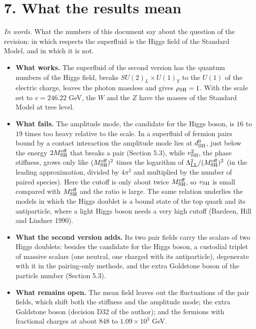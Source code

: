 \documentclass[
  10pt,
]{article}
\providecommand{\tightlist}{%
  \setlength{\itemsep}{0pt}\setlength{\parskip}{0pt}}
\begin{document}
\hypertarget{what-the-results-mean}{%
\section{7. What the results mean}\label{what-the-results-mean}}

\emph{In words.} What the numbers of this document say about the
question of the revision: in which respects the superfluid is the Higgs
field of the Standard Model, and in which it is not.

\begin{itemize}
\tightlist
\item
  \textbf{What works.} The superfluid of the second version has the
  quantum numbers of the Higgs field, breaks \(SU(2)_L\times U(1)_Y\) to
  the \(U(1)\) of the electric charge, leaves the photon massless and
  gives \(\rho_{\rm SH}=1\). With the scale set to \(v=246.22\) GeV, the
  \(W\) and the \(Z\) have the masses of the Standard Model at tree
  level.
\item
  \textbf{What fails.} The amplitude mode, the candidate for the Higgs
  boson, is \(16\) to \(19\) times too heavy relative to the scale. In a
  superfluid of fermion pairs bound by a contact interaction the
  amplitude mode lies at \(d^0_{\rm SH}\), just below the energy
  \(2M^{\rm eff}_{\rm SH}\) that breaks a pair (Section 5.3), while
  \(v_{\rm SH}^2\), the phase stiffness, grows only like
  \((M^{\rm eff}_{\rm SH})^2\) times the logarithm of
  \(\Lambda_{\rm LL}^2/(M^{\rm eff}_{\rm SH})^2\) (in the leading
  approximation, divided by \(4\pi^2\) and multiplied by the number of
  paired species). Here the cutoff is only about twice
  \(M^{\rm eff}_{\rm SH}\), so \(v_{\rm SH}\) is small compared with
  \(M^{\rm eff}_{\rm SH}\) and the ratio is large. The same relation
  underlies the models in which the Higgs doublet is a bound state of
  the top quark and its antiparticle, where a light Higgs boson needs a
  very high cutoff (Bardeen, Hill and Lindner 1990).
\item
  \textbf{What the second version adds.} Its two pair fields carry the
  scalars of two Higgs doublets: besides the candidate for the Higgs
  boson, a custodial triplet of massive scalars (one neutral, one
  charged with its antiparticle), degenerate with it in the pairing-only
  methods, and the extra Goldstone boson of the particle number (Section
  5.3).
\item
  \textbf{What remains open.} The mean field leaves out the fluctuations
  of the pair fields, which shift both the stiffness and the amplitude
  mode; the extra Goldstone boson (decision D32 of the author); and the
  fermions with fractional charges at about \(848\) to
  \(1.09\times10^{3}\) GeV.
\end{itemize}
\end{document}
